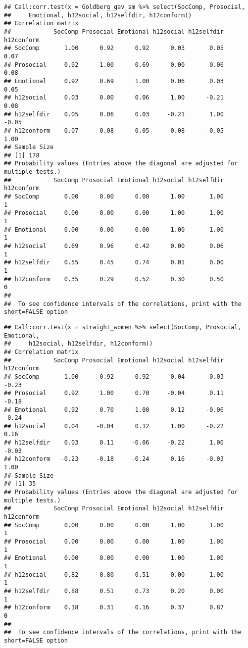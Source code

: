 \documentclass[man]{apa6}
\begin{document}
\begin{verbatim}
## Call:corr.test(x = Goldberg_gav_sm %>% select(SocComp, Prosocial, 
##     Emotional, h12social, h12selfdir, h12conform))
## Correlation matrix 
##            SocComp Prosocial Emotional h12social h12selfdir h12conform
## SocComp       1.00      0.92      0.92      0.03       0.05       0.07
## Prosocial     0.92      1.00      0.69      0.00       0.06       0.08
## Emotional     0.92      0.69      1.00      0.06       0.03       0.05
## h12social     0.03      0.00      0.06      1.00      -0.21       0.08
## h12selfdir    0.05      0.06      0.03     -0.21       1.00      -0.05
## h12conform    0.07      0.08      0.05      0.08      -0.05       1.00
## Sample Size 
## [1] 178
## Probability values (Entries above the diagonal are adjusted for multiple tests.) 
##            SocComp Prosocial Emotional h12social h12selfdir h12conform
## SocComp       0.00      0.00      0.00      1.00       1.00          1
## Prosocial     0.00      0.00      0.00      1.00       1.00          1
## Emotional     0.00      0.00      0.00      1.00       1.00          1
## h12social     0.69      0.96      0.42      0.00       0.06          1
## h12selfdir    0.55      0.45      0.74      0.01       0.00          1
## h12conform    0.35      0.29      0.52      0.30       0.50          0
## 
##  To see confidence intervals of the correlations, print with the short=FALSE option
\end{verbatim}

\begin{verbatim}
## Call:corr.test(x = straight_women %>% select(SocComp, Prosocial, Emotional, 
##     h12social, h12selfdir, h12conform))
## Correlation matrix 
##            SocComp Prosocial Emotional h12social h12selfdir h12conform
## SocComp       1.00      0.92      0.92      0.04       0.03      -0.23
## Prosocial     0.92      1.00      0.70     -0.04       0.11      -0.18
## Emotional     0.92      0.70      1.00      0.12      -0.06      -0.24
## h12social     0.04     -0.04      0.12      1.00      -0.22       0.16
## h12selfdir    0.03      0.11     -0.06     -0.22       1.00      -0.03
## h12conform   -0.23     -0.18     -0.24      0.16      -0.03       1.00
## Sample Size 
## [1] 35
## Probability values (Entries above the diagonal are adjusted for multiple tests.) 
##            SocComp Prosocial Emotional h12social h12selfdir h12conform
## SocComp       0.00      0.00      0.00      1.00       1.00          1
## Prosocial     0.00      0.00      0.00      1.00       1.00          1
## Emotional     0.00      0.00      0.00      1.00       1.00          1
## h12social     0.82      0.80      0.51      0.00       1.00          1
## h12selfdir    0.88      0.51      0.73      0.20       0.00          1
## h12conform    0.18      0.31      0.16      0.37       0.87          0
## 
##  To see confidence intervals of the correlations, print with the short=FALSE option
\end{verbatim}
\end{document}

